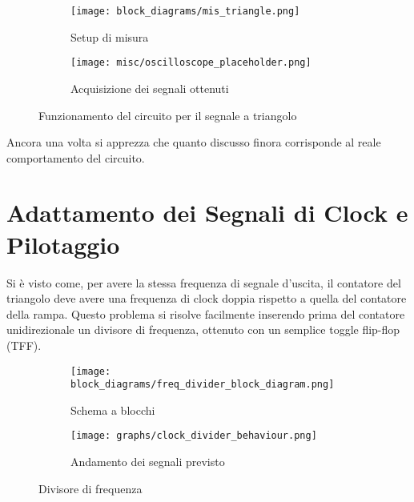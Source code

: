 \begin{figure}[H]
    \centering

    \begin{subfigure}{.5\textwidth}
        \centering
        \texttt{[image: block\_diagrams/mis\_triangle.png]}
        \caption{Setup di misura}
        \label{mis_triangle}
    \end{subfigure}%
    \begin{subfigure}{.5\textwidth}
        \centering
        \texttt{[image: misc/oscilloscope\_placeholder.png]}
        \caption{Acquisizione dei segnali ottenuti}
        \label{acq_triangle}
    \end{subfigure}

    \caption{Funzionamento del circuito per il segnale a triangolo}
    \label{acq_triangle_signals}
\end{figure}

Ancora una volta si apprezza che quanto discusso finora corrisponde al reale comportamento
del circuito.


\section{Adattamento dei Segnali di Clock e Pilotaggio}


Si è visto come, per avere la stessa frequenza di segnale d'uscita, il contatore del
triangolo deve avere una frequenza di clock doppia rispetto a quella del contatore della
rampa. Questo problema si risolve facilmente inserendo prima del contatore unidirezionale
un divisore di frequenza, ottenuto con un semplice toggle flip-flop (TFF).

\begin{figure}[H]
    \centering

    \begin{subfigure}{.5\textwidth}
        \centering
        \texttt{[image: block\_diagrams/freq\_divider\_block\_diagram.png]}
        \caption{Schema a blocchi}
        \label{freq_divider_block_diagram}
    \end{subfigure}%
    \begin{subfigure}{.5\textwidth}
        \centering
        \texttt{[image: graphs/clock\_divider\_behaviour.png]}
        \caption{Andamento dei segnali previsto}
        \label{clock_divider_behaviour}
    \end{subfigure}

    \caption{Divisore di frequenza}
\end{figure}

